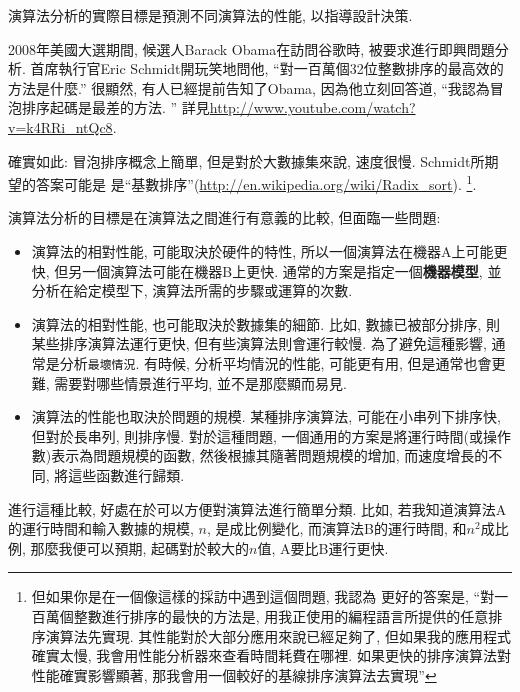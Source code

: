 \documentclass[10pt]{book}
\begin{document}
演算法分析的實際目標是預測不同演算法的性能, 以指導設計決策. 

2008年美國大選期間, 候選人Barack Obama在訪問谷歌時, 被要求進行即興問題分析. 
首席執行官Eric Schmidt開玩笑地問他, ``對一百萬個32位整數排序的最高效的方法是什麼.''
很顯然, 有人已經提前告知了Obama, 因為他立刻回答道, ``我認為冒泡排序起碼是最差的方法. ''
詳見\url{http://www.youtube.com/watch?v=k4RRi_ntQc8}.

確實如此: 冒泡排序概念上簡單, 但是對於大數據集來說, 速度很慢. 
Schmidt所期望的答案可能是
是``基數排序''(\url{http://en.wikipedia.org/wiki/Radix_sort}). \footnote{
但如果你是在一個像這樣的採訪中遇到這個問題, 我認為
更好的答案是, ``對一百萬個整數進行排序的最快的方法是, 
用我正使用的編程語言所提供的任意排序演算法先實現. 
其性能對於大部分應用來說已經足夠了, 但如果我的應用程式確實太慢, 
我會用性能分析器來查看時間耗費在哪裡. 
如果更快的排序演算法對性能確實影響顯著, 那我會用一個較好的基線排序演算法去實現''}.

演算法分析的目標是在演算法之間進行有意義的比較, 但面臨一些問題:

\begin{itemize}

\item 演算法的相對性能, 可能取決於硬件的特性, 所以一個演算法在機器A上可能更快, 
但另一個演算法可能在機器B上更快. 
通常的方案是指定一個{\bf 機器模型}, 並分析在給定模型下, 
演算法所需的步驟或運算的次數. 

\item 演算法的相對性能, 也可能取決於數據集的細節. 
比如, 數據已被部分排序, 則某些排序演算法運行更快, 
但有些演算法則會運行較慢. 
為了避免這種影響, 通常是分析{\tt 最壞情況}. 
有時候, 分析平均情況的性能, 可能更有用, 但是通常也會更難, 
需要對哪些情景進行平均, 並不是那麼顯而易見. 

\item 演算法的性能也取決於問題的規模. 
某種排序演算法, 可能在小串列下排序快, 但對於長串列, 則排序慢. 
對於這種問題, 一個通用的方案是將運行時間(或操作數)表示為問題規模的函數, 
然後根據其隨著問題規模的增加, 而速度增長的不同, 將這些函數進行歸類. 

\end{itemize}

進行這種比較, 好處在於可以方便對演算法進行簡單分類. 
比如, 若我知道演算法A的運行時間和輸入數據的規模, $n$, 是成比例變化, 
而演算法B的運行時間, 和$n^2$成比例, 
那麼我便可以預期, 起碼對於較大的$n$值, A要比B運行更快. 
\end{document}
